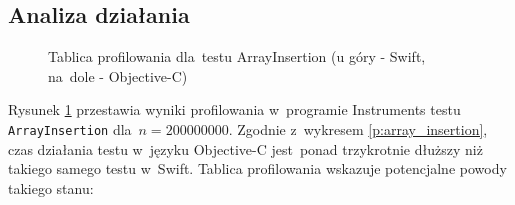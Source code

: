 \documentclass[mgr, shortabstract]{iithesis}
\begin{document}
\subsection{Analiza działania}

\begin{figure}
    \caption{Tablica profilowania dla~testu ArrayInsertion (u góry - Swift, na~dole - Objective-C)}
    \label{i:array_insertion}
\end{figure}

Rysunek \ref{i:array_insertion} przestawia wyniki profilowania w~programie Instruments testu \texttt{ArrayInsertion} dla~$n = 200000000$. Zgodnie z~wykresem \ref{p:array_insertion}, czas działania testu w~języku Objective-C jest~ponad trzykrotnie dłuższy niż takiego samego testu w~Swift. Tablica profilowania wskazuje potencjalne powody takiego stanu:
\end{document}
